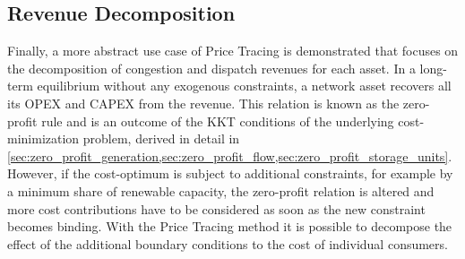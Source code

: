\documentclass[11pt,twocolumn]{article}
\begin{document}





\subsection{Revenue Decomposition}

Finally, a more abstract use case of Price Tracing is demonstrated that focuses on the decomposition of congestion and dispatch revenues for each asset. In a long-term equilibrium without any exogenous constraints, a network asset recovers all its \ac{OPEX} and \ac{CAPEX} from the revenue. This relation is known as the zero-profit rule and is an outcome of the \ac{KKT} conditions of the underlying cost-minimization problem, derived in detail in \cref{sec:zero_profit_generation,sec:zero_profit_flow,sec:zero_profit_storage_units}. However, if the cost-optimum is subject to additional constraints, for example by a minimum share of renewable capacity, the zero-profit relation is altered and more cost contributions have to be considered \cite{brown_decreasing_2020} as soon as the new constraint becomes binding. With the Price Tracing method it is possible to decompose the effect of the additional boundary conditions to the cost of individual consumers.
\end{document}
